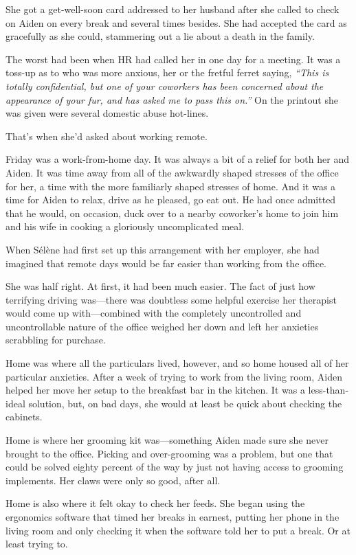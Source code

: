She got a get-well-soon card addressed to her husband after she called to check on Aiden on every break and several times besides. She had accepted the card as gracefully as she could, stammering out a lie about a death in the family.

The worst had been when HR had called her in one day for a meeting. It was a toss-up as to who was more anxious, her or the fretful ferret saying, \emph{``This is totally confidential, but one of your coworkers has been concerned about the appearance of your fur, and has asked me to pass this on.''} On the printout she was given were several domestic abuse hot-lines.

That's when she'd asked about working remote.

Friday was a work-from-home day. It was always a bit of a relief for both her and Aiden. It was time away from all of the awkwardly shaped stresses of the office for her, a time with the more familiarly shaped stresses of home. And it was a time for Aiden to relax, drive as he pleased, go eat out. He had once admitted that he would, on occasion, duck over to a nearby coworker's home to join him and his wife in cooking a gloriously uncomplicated meal.

When Sélène had first set up this arrangement with her employer, she had imagined that remote days would be far easier than working from the office.

She was half right. At first, it had been much easier. The fact of just how terrifying driving was---there was doubtless some helpful exercise her therapist would come up with---combined with the completely uncontrolled and uncontrollable nature of the office weighed her down and left her anxieties scrabbling for purchase.

Home was where all the particulars lived, however, and so home housed all of her particular anxieties. After a week of trying to work from the living room, Aiden helped her move her setup to the breakfast bar in the kitchen. It was a less-than-ideal solution, but, on bad days, she would at least be quick about checking the cabinets.

Home is where her grooming kit was---something Aiden made sure she never brought to the office. Picking and over-grooming was a problem, but one that could be solved eighty percent of the way by just not having access to grooming implements. Her claws were only so good, after all.

Home is also where it felt okay to check her feeds. She began using the ergonomics software that timed her breaks in earnest, putting her phone in the living room and only checking it when the software told her to put a break. Or at least trying to.


